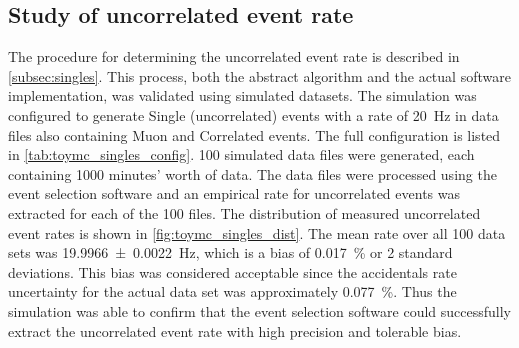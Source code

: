 \subsection{Study of uncorrelated event rate}

The procedure for determining the uncorrelated event rate
is described in \cref{subsec:singles}.
This process, both the abstract algorithm and the actual software implementation,
was validated using simulated datasets.
The simulation was configured to generate Single (uncorrelated) events
with a rate of \SI{20}{\Hz}
in data files also containing Muon and Correlated events.
The full configuration is listed in \cref{tab:toymc_singles_config}.
100 simulated data files were generated,
each containing 1000 minutes' worth of data.
The data files were processed using the event selection software
and an empirical rate for uncorrelated events was extracted
for each of the 100 files.
The distribution of measured uncorrelated event rates
is shown in \cref{fig:toymc_singles_dist}.
The mean rate over all 100 data sets
was \SI{19.9966+-0.0022}{\Hz},
which is a bias of \SI{0.017}{\percent} or 2 standard deviations.
This bias was considered acceptable
since the accidentals rate uncertainty
for the actual data set was approximately \SI{0.077}{\percent}.
Thus the simulation was able to confirm that
the event selection software could successfully extract
the uncorrelated event rate with high precision and tolerable bias.

